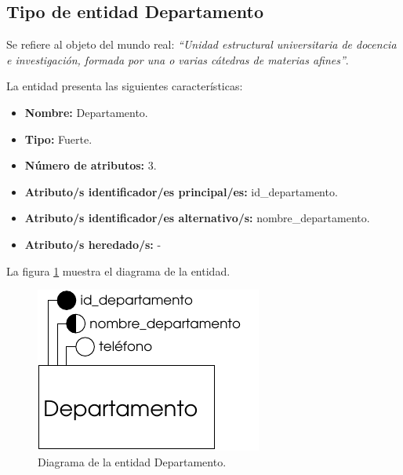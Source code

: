 \subsection{Tipo de entidad Departamento}

   \begin{description}

   \item[Definición] Se refiere al objeto del mundo real: \emph{``Unidad
   estructural universitaria de docencia e investigación, formada por una o
   varias cátedras de materias afines''}.

   \item[Características] La entidad presenta las siguientes características:
      \begin{itemize}
         \item \textbf{Nombre:} Departamento.
         \item \textbf{Tipo:} Fuerte.
         \item \textbf{Número de atributos:} 3.
         \item \textbf{Atributo/s identificador/es principal/es:} id\_departamento.
         \item \textbf{Atributo/s identificador/es alternativo/s:} nombre\_departamento.
         \item \textbf{Atributo/s heredado/s:} -
      \end{itemize}

   \item[Diagrama] La figura \ref{diagramaDepartamento} muestra el diagrama de la entidad.
   \item \begin{figure}[!ht]
            \begin{center}
            \includegraphics[]{07.Modelo_Entidad-Interrelacion/7.2.Analisis_Entidades/diagramas/departamento.pdf}
            \caption{Diagrama de la entidad Departamento.}
            \label{diagramaDepartamento}
            \end{center}
         \end{figure}


\end{description}
